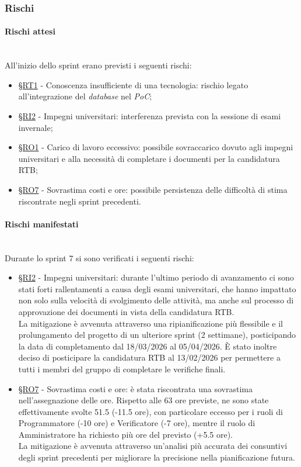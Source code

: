 \documentclass[10pt, letterpaper]{article}
\newcommand{\trisubsection}[1]{\paragraph{#1}\mbox{}\\}
\newcommand{\rif}[1]{\hyperref[#1]{§#1}}
\begin{document}
\subsubsection{Rischi}
\trisubsection{Rischi attesi}
All'inizio dello sprint erano previsti i seguenti rischi:
\begin{itemize}
    \item \rif{RT1} - Conoscenza insufficiente di una tecnologia: rischio legato all'integrazione del \textit{database} nel \textit{PoC};
    \item \rif{RI2} - Impegni universitari: interferenza prevista con la sessione di esami invernale;
    \item \rif{RO1} - Carico di lavoro eccessivo: possibile sovraccarico dovuto agli impegni universitari e alla necessità di completare i documenti per la candidatura RTB;
    \item \rif{RO7} - Sovrastima costi e ore: possibile persistenza delle difficoltà di stima riscontrate negli sprint precedenti.
\end{itemize}
\trisubsection{Rischi manifestati}
Durante lo sprint 7 si sono verificati i seguenti rischi:
\begin{itemize}
    \item \rif{RI2} - Impegni universitari: durante l'ultimo periodo di avanzamento ci sono stati forti rallentamenti a causa degli esami universitari, che hanno impattato non solo sulla velocità di svolgimento delle attività, ma anche sul processo di approvazione dei documenti in vista della candidatura RTB.
          \\La mitigazione è avvenuta attraverso una ripianificazione più flessibile e il prolungamento del progetto di un ulteriore sprint (2 settimane), posticipando la data di completamento dal 18/03/2026 al 05/04/2026. È stato inoltre deciso di posticipare la candidatura RTB al 13/02/2026 per permettere a tutti i membri del gruppo di completare le verifiche finali.
    \item \rif{RO7} - Sovrastima costi e ore: è stata riscontrata una sovrastima nell'assegnazione delle ore. Rispetto alle 63 ore previste, ne sono state effettivamente svolte 51.5 (-11.5 ore), con particolare eccesso per i ruoli di Programmatore (-10 ore) e Verificatore (-7 ore), mentre il ruolo di Amministratore ha richiesto più ore del previsto (+5.5 ore).
          \\La mitigazione è avvenuta attraverso un'analisi più accurata dei consuntivi degli sprint precedenti per migliorare la precisione nella pianificazione futura.
\end{itemize}
\end{document}
